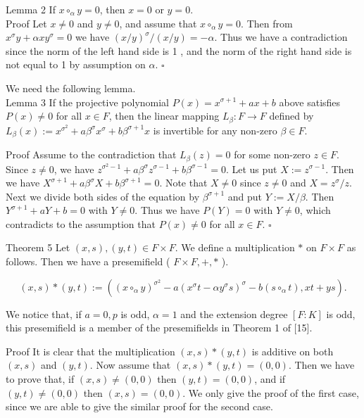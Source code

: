 \documentclass[10pt]{article}
\begin{document}
Lemma 2 If $x \circ_{\alpha} y=0$, then $x=0$ or $y=0$.\\
Proof Let $x \neq 0$ and $y \neq 0$, and assume that $x \circ_{\alpha} y=0$. Then from $x^{\sigma} y+\alpha x y^{\sigma}=0$ we have $(x / y)^{\sigma} /(x / y)=-\alpha$. Thus we have a contradiction since the norm of the left hand side is 1 , and the norm of the right hand side is not equal to 1 by assumption on $\alpha$. \(\square\)

We need the following lemma.\\
Lemma 3 If the projective polynomial $P(x)=x^{\sigma+1}+a x+b$ above satisfies $P(x) \neq 0$ for all $x \in F$, then the linear mapping $L_{\beta}: F \rightarrow F$ defined by $L_{\beta}(x):=x^{\sigma^{2}}+a \beta^{\sigma} x^{\sigma}+b \beta^{\sigma+1} x$ is invertible for any non-zero $\beta \in F$.

Proof Assume to the contradiction that $L_{\beta}(z)=0$ for some non-zero $z \in F$. Since $z \neq 0$, we have $z^{\sigma^{2}-1}+a \beta^{\sigma} z^{\sigma-1}+b \beta^{\sigma-1}=0$. Let us put $X:=z^{\sigma-1}$. Then we have $X^{\sigma+1}+ a \beta^{\sigma} X+b \beta^{\sigma+1}=0$. Note that $X \neq 0$ since $z \neq 0$ and $X=z^{\sigma} / z$. Next we divide both sides of the equation by $\beta^{\sigma+1}$ and put $Y:=X / \beta$. Then $Y^{\sigma+1}+a Y+b=0$ with $Y \neq 0$. Thus we have $P(Y)=0$ with $Y \neq 0$, which contradicts to the assumption that $P(x) \neq 0$ for all $x \in F$. \(\square\)

Theorem 5 Let $(x, s),(y, t) \in F \times F$. We define a multiplication $*$ on $F \times F$ as follows. Then we have a presemifield ( $F \times F,+, *$ ).


\begin{equation*}
(x, s) *(y, t):=\left(\left(x \circ_{\alpha} y\right)^{\sigma^{2}}-a\left(x^{\sigma} t-\alpha y^{\sigma} s\right)^{\sigma}-b\left(s \circ_{\alpha} t\right), x t+y s\right) . \tag{3}
\end{equation*}


We notice that, if $a=0, p$ is odd, $\alpha=1$ and the extension degree $[F: K]$ is odd, this presemifield is a member of the presemifields in Theorem 1 of [15].

Proof It is clear that the multiplication $(x, s) *(y, t)$ is additive on both $(x, s)$ and $(y, t)$. Now assume that $(x, s) *(y, t)=(0,0)$. Then we have to prove that, if $(x, s) \neq(0,0)$ then $(y, t)=(0,0)$, and if $(y, t) \neq(0,0)$ then $(x, s)=(0,0)$. We only give the proof of the first case, since we are able to give the similar proof for the second case.
\end{document}
